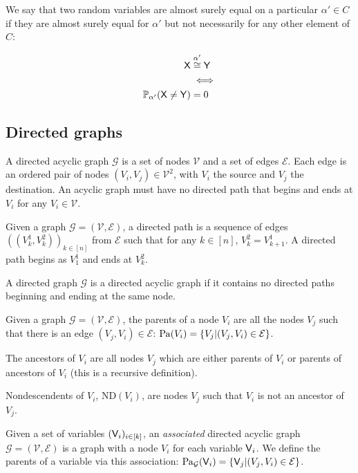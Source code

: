 We say that two random variables are almost surely equal on a particular $\alpha'\in C$ if they are almost surely equal for $\alpha'$ but not necessarily for any other element of $C$:

\begin{align}
	\mathsf{X} &\overset{\alpha'}{\cong} \mathsf{Y}\\
	&\iff\\
	\mathbb{P}_{\alpha'}(\mathsf{X}\neq \mathsf{Y}) &= 0
\end{align}


\subsection{Directed graphs}\label{sec:d_graphs}


\begin{definition}
A directed acyclic graph $\mathcal{G}$ is a set of nodes $\mathcal{V}$ and a set of edges $\mathcal{E}$. Each edge is an ordered pair of nodes $(V_i,V_j)\in \mathcal{V}^2$, with $V_i$ the source and $V_j$ the destination. An acyclic graph must have no directed path that begins and ends at $V_i$ for any $V_i\in\mathcal{V}$.
\end{definition}

\begin{definition}
Given a graph $\mathcal{G}=(\mathcal{V},\mathcal{E})$, a directed path is a sequence of edges $((V^1_{k},V^2_{k}))_{k\in [n]}$ from $\mathcal{E}$ such that for any $k\in [n]$, $V^2_k=V^1_{k+1}$. A directed path begins as $V^1_1$ and ends at $V^2_k$.
\end{definition}

\begin{definition}
A directed graph $\mathcal{G}$ is a directed acyclic graph if it contains no directed paths beginning and ending at the same node.
\end{definition}

\begin{definition}
Given a graph $\mathcal{G}=(\mathcal{V},\mathcal{E})$, the parents of a node $V_i$ are all the nodes $V_j$ such that there is an edge $(V_j, V_i)\in \mathcal{E}$: $\mathrm{Pa}(V_i)=\{V_j|(V_j,V_i)\in \mathcal{E}\}$.

The ancestors of $V_i$ are all nodes $V_j$ which are either parents of $V_i$ or parents of ancestors of $V_i$ (this is a recursive definition).

Nondescendents of $V_i$, $\mathrm{ND}(V_i)$, are nodes $V_j$ such that $V_i$ is not an ancestor of $V_j$.
\end{definition}

\begin{definition}\label{def:mga}
Given a set of variables $(\mathsf{V}_i)_{i\in [k]}$, an \emph{associated} directed acyclic graph $\mathcal{G}=(\mathcal{V},\mathcal{E})$ is a graph with a node $V_i$ for each variable $\mathsf{V}_i$. We define the parents of a variable via this association: $\mathrm{Pa}_\mathcal{G}(\mathsf{V}_i)=\{\mathsf{V}_j|(V_j,V_i)\in \mathcal{E}\}$.
\end{definition}

